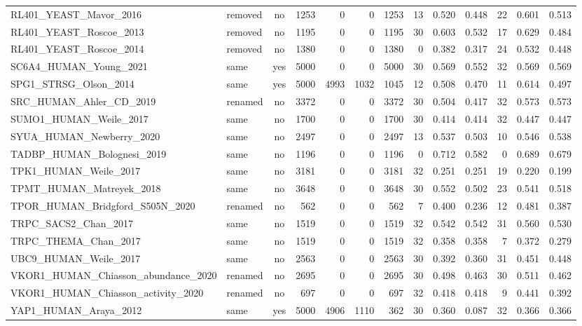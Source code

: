 \documentclass[11pt,a4paper]{article}
\begin{document}
\begin{landscape}
\begin{longtable}{llcrrrrrrrrrr}
RL401\_YEAST\_Mavor\_2016 & removed & no & 1253 & 0 & 0 & 1253 & 13 & 0.520 & 0.448 & 22 & 0.601 & 0.513 \\
RL401\_YEAST\_Roscoe\_2013 & removed & no & 1195 & 0 & 0 & 1195 & 30 & 0.603 & 0.532 & 17 & 0.629 & 0.484 \\
RL401\_YEAST\_Roscoe\_2014 & removed & no & 1380 & 0 & 0 & 1380 & 0 & 0.382 & 0.317 & 24 & 0.532 & 0.448 \\
SC6A4\_HUMAN\_Young\_2021 & same & yes & 5000 & 0 & 0 & 5000 & 30 & 0.569 & 0.552 & 32 & 0.569 & 0.569 \\
SPG1\_STRSG\_Olson\_2014 & same & yes & 5000 & 4993 & 1032 & 1045 & 12 & 0.508 & 0.470 & 11 & 0.614 & 0.497 \\
SRC\_HUMAN\_Ahler\_CD\_2019 & renamed & no & 3372 & 0 & 0 & 3372 & 30 & 0.504 & 0.417 & 32 & 0.573 & 0.573 \\
SUMO1\_HUMAN\_Weile\_2017 & same & no & 1700 & 0 & 0 & 1700 & 30 & 0.414 & 0.414 & 32 & 0.447 & 0.447 \\
SYUA\_HUMAN\_Newberry\_2020 & same & no & 2497 & 0 & 0 & 2497 & 13 & 0.537 & 0.503 & 10 & 0.546 & 0.538 \\
TADBP\_HUMAN\_Bolognesi\_2019 & same & no & 1196 & 0 & 0 & 1196 & 0 & 0.712 & 0.582 & 0 & 0.689 & 0.679 \\
TPK1\_HUMAN\_Weile\_2017 & same & no & 3181 & 0 & 0 & 3181 & 32 & 0.251 & 0.251 & 19 & 0.220 & 0.199 \\
TPMT\_HUMAN\_Matreyek\_2018 & same & no & 3648 & 0 & 0 & 3648 & 30 & 0.552 & 0.502 & 23 & 0.541 & 0.518 \\
TPOR\_HUMAN\_Bridgford\_S505N\_2020 & renamed & no & 562 & 0 & 0 & 562 & 7 & 0.400 & 0.236 & 12 & 0.481 & 0.387 \\
TRPC\_SACS2\_Chan\_2017 & same & no & 1519 & 0 & 0 & 1519 & 32 & 0.542 & 0.542 & 31 & 0.560 & 0.530 \\
TRPC\_THEMA\_Chan\_2017 & same & no & 1519 & 0 & 0 & 1519 & 32 & 0.358 & 0.358 & 7 & 0.372 & 0.279 \\
UBC9\_HUMAN\_Weile\_2017 & same & no & 2563 & 0 & 0 & 2563 & 30 & 0.392 & 0.360 & 31 & 0.451 & 0.448 \\
VKOR1\_HUMAN\_Chiasson\_abundance\_2020 & renamed & no & 2695 & 0 & 0 & 2695 & 30 & 0.498 & 0.463 & 30 & 0.511 & 0.462 \\
VKOR1\_HUMAN\_Chiasson\_activity\_2020 & renamed & no & 697 & 0 & 0 & 697 & 32 & 0.418 & 0.418 & 9 & 0.441 & 0.392 \\
YAP1\_HUMAN\_Araya\_2012 & same & yes & 5000 & 4906 & 1110 & 362 & 30 & 0.360 & 0.087 & 32 & 0.366 & 0.366 \\
\end{longtable}\end{landscape}
\end{document}
